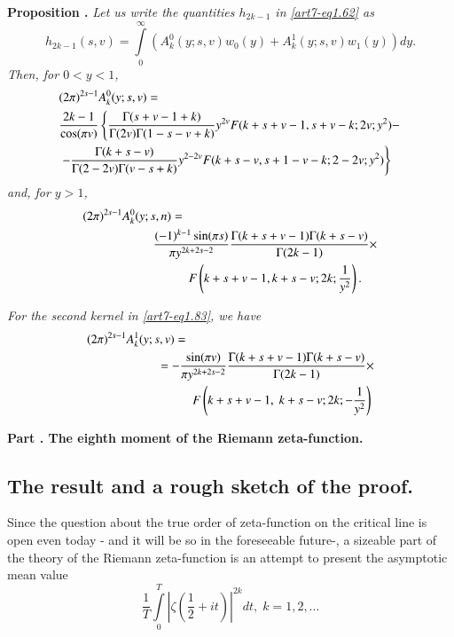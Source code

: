 \medskip
\noindent
{\bfseries Proposition .\label{art7-prop5}} 
\textit{Let us write the quantities $h_{2k-1}$ in \eqref{art7-eq1.62} as}
\begin{equation}
h_{2k-1} (s,v) = \int\limits^\infty_0 (A^0_k (y;s, v) w_0 (y) + A^1_k (y;s,v) w_1 (y)) dy. \label{art7-eq1.83}
\end{equation}
\textit{Then, for $0<y<1$,}
\begin{align}
&(2\pi)^{2s-1} A^0_k (y; s, v) =\label{art7-eq1.84}\\
&\frac{2k-1}{\cos (\pi v)} \left\{\frac{\Gamma (s+ v-1+k)}{\Gamma (2v) \Gamma (1-s-v+k)} y^{2v} F (k+s+v -1, s+v-k; 2 v ; y^2) - \right.\notag \\
& \left. -\frac{\Gamma (k+s-v)}{\Gamma (2-2v)\Gamma (v-s+k)} y^{2-2v} F(k+s-v, s+1-v-k; 2-2v; y^2) \right\} \notag
\end{align}
\textit{and, for $y>1$,}
\begin{align}
& (2\pi)^{2s-1} A^0_k (y;s,n) = \hspace{2cm} \label{art7-eq1.85} \\
& \hspace{2cm} \frac{(-1)^{k-1} \sin (\pi s) }{\pi y^{2k+2s-2}} \frac{\Gamma (k+s+v-1) \Gamma(k+s-v)}{\Gamma (2k-1)} \times \notag\\
& \hspace{3cm} F \left(k+s + v -1 , k + s-v; 2k; \frac{1}{y^2} \right). \notag
\end{align}

\textit{For the second kernel in \eqref{art7-eq1.83}, we have}
\begin{align}
&(2\pi)^{2s-1} A^1_k (y; s, v) = \hspace{2cm}\\
&\hspace{2cm} = - \frac{\sin (\pi v)}{\pi y^{2k+ 2s -2}} \frac{\Gamma (k+ s+v -1) \Gamma (k+s-v)}{ \Gamma (2k-1)} \times  \notag\\
&\hspace{3cm} F\left(k + s + v -1, \; k + s- v; 2k; - \frac{1}{y^2} \right) \notag
\end{align}

\bigskip
\begin{center}
{\Large \textbf{Part .\label{art7-partII} The eighth moment of the Riemann zeta-function.}}
\end{center}

\setcounter{section}{2}
\setcounter{subsection}{0}
\subsection{The result and a rough sketch of the proof.}\label{art7-sec2.1}
Since the question about the true order of zeta-function on the critical line is open even today - and it will be so in the foreseeable future-, a sizeable part of the theory of the Riemann zeta-function is an attempt to present the asymptotic mean value
\setcounter{equation}{0}
\begin{equation}
\frac{1}{T} \int\limits^T_0 |\zeta (\frac{1}{2} + it)|^{2k} dt, \; k = 1, 2, \ldots \label{art7-eq2.1}
\end{equation}

